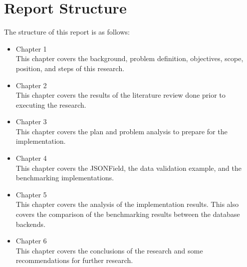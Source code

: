 \section{Report Structure}

The structure of this report is as follows:

\begin{itemize}
    \item Chapter 1 \babSatu \\
        This chapter covers the background, problem definition, objectives,
        scope, position, and steps of this research.
    \item Chapter 2 \babDua \\
        This chapter covers the results of the literature review done prior to
        executing the research.
    \item Chapter 3 \babTiga \\
        This chapter covers the plan and problem analysis to prepare for the
        implementation.
    \item Chapter 4 \babEmpat \\
        This chapter covers the JSONField, the data validation example, and
        the benchmarking implementations.
    \item Chapter 5 \babLima \\
        This chapter covers the analysis of the implementation results. This
        also covers the comparison of the benchmarking results between the
        database backends.
    \item Chapter 6 \kesimpulan \\
        This chapter covers the conclusions of the research and some
        recommendations for further research.
\end{itemize}
